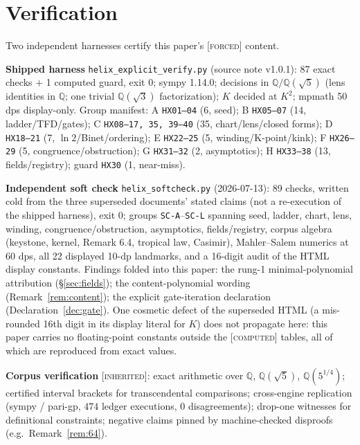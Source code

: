 \documentclass[11pt]{article}
\newcommand{\tagF}{\textcolor{cF}{\textsc{[forced]}}}
\newcommand{\tagC}{\textcolor{cC}{\textsc{[computed]}}}
\newcommand{\tagI}{\textcolor{cI}{\textsc{[inherited]}}}
\newcommand{\hx}[1]{\textcolor{cC}{\footnotesize\texttt{#1}}}
\newcommand{\Q}{\mathbb{Q}}
\theoremstyle{plain}
\theoremstyle{definition}
\theoremstyle{remark}
\begin{document}
\section{Verification}\label{sec:verification}
Two independent harnesses certify this paper's \tagF{} content.

\smallskip\noindent
\textbf{Shipped harness} \texttt{helix\_explicit\_verify.py} (source note v1.0.1):
87 exact checks $+$ 1 computed guard, exit 0; sympy 1.14.0; decisions in
$\Q/\Q(\sqrt5)$ (lens identities in $\Q$; one trivial $\Q(\sqrt3)$ factorization);
$K$ decided at $K^2$; mpmath 50 dps display-only. Group manifest: A \hx{HX01--04}
(6, seed); B \hx{HX05--07} (14, ladder/TFD/gates); C \hx{HX08--17, 35, 39--40}
(35, chart/lens/closed forms); D \hx{HX18--21} (7, $\ln2$/Binet/ordering);
E \hx{HX22--25} (5, winding/K-point/kink); F \hx{HX26--29} (5,
congruence/obstruction); G \hx{HX31--32} (2, asymptotics); H \hx{HX33--38}
(13, fields/registry); guard \hx{HX30} (1, near-miss).

\smallskip\noindent
\textbf{Independent soft check} \texttt{helix\_softcheck.py} (2026-07-13): 89 checks,
written cold from the three superseded documents' stated claims (not a re-execution
of the shipped harness), exit 0; groups \hx{SC-A}--\hx{SC-L} spanning seed, ladder,
chart, lens, winding, congruence/obstruction, asymptotics, fields/registry, corpus
algebra (keystone, kernel, Remark 6.4, tropical law, Casimir), Mahler--Salem numerics
at 60 dps, all 22 displayed 10-dp landmarks, and a 16-digit audit of the HTML display
constants. Findings folded into this paper: the rung-1 minimal-polynomial attribution
(\S\ref{sec:fields}); the content-polynomial wording (Remark~\ref{rem:content}); the
explicit gate-iteration declaration (Declaration~\ref{dec:gate}). One cosmetic defect
of the superseded HTML (a mis-rounded 16th digit in its display literal for $K$) does
not propagate here: this paper carries no floating-point constants outside the
\tagC{} tables, all of which are reproduced from exact values.

\smallskip\noindent
\textbf{Corpus verification} \tagI{}: exact arithmetic over $\Q$, $\Q(\sqrt5)$,
$\Q(5^{1/4})$; certified interval brackets for transcendental comparisons;
cross-engine replication (sympy / pari-gp, $474$ ledger executions, $0$
disagreements); drop-one witnesses for definitional constraints; negative claims
pinned by machine-checked disproofs (e.g.\ Remark~\ref{rem:64}).

\appendix
\end{document}
